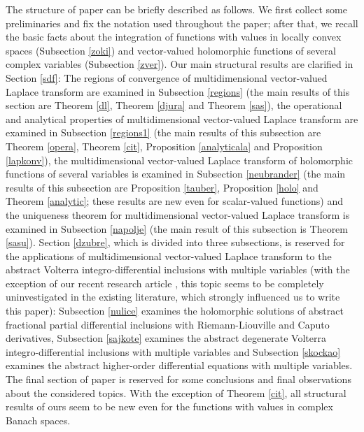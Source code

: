 \documentclass{amsart}
\theoremstyle{definition}
\theoremstyle{remark}
\numberwithin{equation}{section}
\begin{document}
The structure of paper can be briefly described as follows. We first collect some preliminaries and fix the notation used throughout the paper; after that, we recall the basic facts about the integration of functions with values in locally convex spaces (Subsection \ref{zoki}) and vector-valued holomorphic functions of several complex variables (Subsection \ref{zver}). Our main structural results are clarified in Section \ref{sdf}: The regions of convergence of multidimensional vector-valued Laplace transform are examined in Subsection \ref{regions} (the main results of this section are Theorem \ref{dl}, Theorem \ref{djura} and Theorem \ref{sas}), the  operational and analytical properties of multidimensional vector-valued Laplace transform are examined in Subsection \ref{regions1} (the main results of this subsection are Theorem \ref{opera}, Theorem \ref{cit}, Proposition \ref{analyticala} and Proposition \ref{lapkonv}), the multidimensional vector-valued Laplace transform of holomorphic functions of several variables is examined in Subsection \ref{neubrander} (the main results of this subsection are Proposition \ref{tauber}, Proposition \ref{holo} and Theorem \ref{analytic}; these results are new even for scalar-valued functions) and the  uniqueness theorem for multidimensional vector-valued Laplace transform is examined in Subsection \ref{napolje} (the main result of this subsection is Theorem \ref{sasu}). Section \ref{dzubre}, which is divided into three subsections, is reserved for the applications of multidimensional vector-valued Laplace transform to the abstract Volterra integro-differential inclusions with multiple variables (with the exception of our recent research article \cite{axioms}, this topic seems to be completely uninvestigated in the existing literature, which strongly influenced us to write this paper): Subsection \ref{nulice} examines the holomorphic solutions of abstract fractional partial differential inclusions with Riemann-Liouville and Caputo derivatives, Subsection \ref{sajkote} examines the abstract degenerate Volterra integro-differential inclusions with multiple variables and Subsection \ref{skockao} examines the abstract higher-order differential equations with multiple variables. The final section of paper is reserved for some conclusions and final observations about the considered topics. With the exception of Theorem \ref{cit}, all structural results of ours seem to be new even for the functions with values in complex Banach spaces.\vspace{0.1cm}
\end{document}
